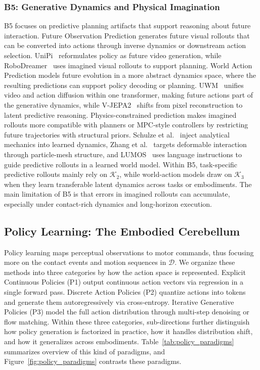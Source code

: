 \documentclass[acmsmall,screen,review]{acmart}
\begin{document}
\subsubsection{B5: Generative Dynamics and Physical Imagination}\label{sec:generative_dynamics}

B5 focuses on predictive planning artifacts that support reasoning about future interaction.
Future Observation Prediction generates future visual rollouts that can be converted into actions through inverse dynamics or downstream action selection.
UniPi~\cite{du2023unipi} reformulates policy as future video generation, 
while RoboDreamer~\cite{zhou2024robodreamer} uses imagined visual rollouts to support planning.
World Action Prediction models future evolution in a more abstract dynamics space, where the resulting predictions can support policy decoding or planning.
UWM~\cite{zhu2025uwm} unifies video and action diffusion within one transformer, making future actions part of the generative dynamics, 
while V-JEPA2~\cite{assran2025vjepa} shifts from pixel reconstruction to latent predictive reasoning.
Physics-constrained prediction makes imagined rollouts more compatible with planners or MPC-style controllers by restricting future trajectories with structural priors.
Schulze et al.~\cite{schulze2025lagrangian} inject analytical mechanics into learned dynamics, 
Zhang et al.~\cite{zhang2025particlegrid} targets deformable interaction through particle-mesh structure, 
and LUMOS~\cite{nematollahi2025lumos} uses language instructions to guide predictive rollouts in a learned world model.
Within B5, task-specific predictive rollouts mainly rely on \(\mathcal{K}_2\), while world-action models draw on \(\mathcal{K}_3\) when they learn transferable latent dynamics across tasks or embodiments.
The main limitation of B5 is that errors in imagined rollouts can accumulate, especially under contact-rich dynamics and long-horizon execution.

\subsection{Policy Learning: The Embodied Cerebellum}\label{sec:policy_learning_low_level}

Policy learning maps perceptual observations to motor commands, thus focusing more on the contact events and motion sequences in \(\mathcal{D}\). 
We organize these methods into three categories by how the action space is represented. 
Explicit Continuous Policies (P1) output continuous action vectors via regression in a single forward pass.
Discrete Action Policies (P2) quantize actions into tokens and generate them autoregressively via cross-entropy. 
Iterative Generative Policies (P3) model the full action distribution through multi-step denoising or flow matching. 
Within these three categories, sub-directions further distinguish how policy generation is factorized in practice, how it handles distribution shift, and how it generalizes across embodiments.
Table~\ref{tab:policy_paradigms} summarizes overview of this kind of paradigms, and Figure~\ref{fig:policy_paradigms} contrasts these paradigms.
\end{document}
